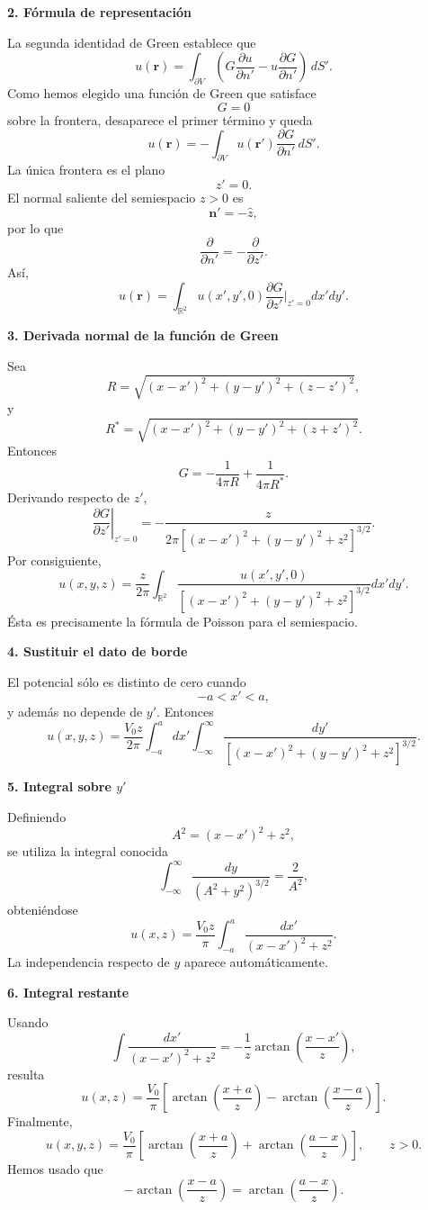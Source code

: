 \documentclass[11pt,spanish]{article}
\begin{document}
{\bf 2. Fórmula de representación}

La segunda identidad de Green establece que
$$
u(\mathbf r)
=
\int_{\partial V}
\left(
G\frac{\partial u}{\partial n'}
-
u
\frac{\partial G}{\partial n'}
\right)
\,dS'.
$$
Como hemos elegido una función de Green que satisface
$$
G=0
$$
sobre la frontera, desaparece el primer término y queda
$$
u(\mathbf r)
=
-
\int_{\partial V}
u(\mathbf r')
\frac{\partial G}{\partial n'}
\,dS'.
$$
La única frontera es el plano
$$
z'=0.
$$
El normal saliente del semiespacio $z>0$ es
$$
\mathbf n'=-\hat z,
$$
por lo que
$$
\frac{\partial}{\partial n'}
=
-\frac{\partial}{\partial z'}.
$$
Así,
$$
u(\mathbf r)
=
\int_{\mathbb R^2}
u(x',y',0)
\frac{\partial G}{\partial z'}
\Bigg|_{z'=0}
dx'dy'.
$$

{\bf 3. Derivada normal de la función de Green}

Sea
$$
R=
\sqrt{(x-x')^2+(y-y')^2+(z-z')^2},
$$
y
$$
R^*
=
\sqrt{(x-x')^2+(y-y')^2+(z+z')^2}.
$$
Entonces
$$
G
=
-\frac1{4\pi R}
+\frac1{4\pi R^*}.
$$
Derivando respecto de $z'$,
$$
\left.
\frac{\partial G}{\partial z'}
\right|_{z'=0}
=
-\frac{z}
{2\pi[(x-x')^2+(y-y')^2+z^2]^{3/2}}.
$$
Por consiguiente,
$$
u(x,y,z)
=
\frac{z}{2\pi}
\int_{\mathbb R^2}
\frac{u(x',y',0)}
{\left[(x-x')^2+(y-y')^2+z^2\right]^{3/2}}
dx'dy'.
$$
Ésta es precisamente la fórmula de Poisson para el semiespacio.

{\bf 4. Sustituir el dato de borde}

El potencial sólo es distinto de cero cuando
$$
-a<x'<a,
$$
y además no depende de $y'$. Entonces
$$
u(x,y,z)
=
\frac{V_0z}{2\pi}
\int_{-a}^{a}
dx'
\int_{-\infty}^{\infty}
\frac{dy'}
{\left[(x-x')^2+(y-y')^2+z^2\right]^{3/2}}.
$$

{\bf 5. Integral sobre $y'$}

Definiendo
$$
A^2=(x-x')^2+z^2,
$$
se utiliza la integral conocida
$$
\int_{-\infty}^{\infty}
\frac{dy}
{(A^2+y^2)^{3/2}}
=
\frac2{A^2},
$$
obteniéndose
$$
u(x,z)
=
\frac{V_0z}{\pi}
\int_{-a}^{a}
\frac{dx'}
{(x-x')^2+z^2}.
$$
La independencia respecto de $y$ aparece automáticamente.

{\bf 6. Integral restante}

Usando
$$
\int
\frac{dx'}
{(x-x')^2+z^2}
=
-\frac1z
\arctan\left(\frac{x-x'}{z}\right),
$$
resulta
$$
u(x,z)
=
\frac{V_0}{\pi}
\left[
\arctan\left(\frac{x+a}{z}\right)
-
\arctan\left(\frac{x-a}{z}\right)
\right].
$$
Finalmente,
$$
\boxed{
u(x,y,z)
=
\frac{V_0}{\pi}
\left[
\arctan\left(\frac{x+a}{z}\right)
+
\arctan\left(\frac{a-x}{z}\right)
\right],
\qquad z>0.
}
$$
Hemos usado que
$$
-\arctan\left(\frac{x-a}{z}\right)
=
\arctan\left(\frac{a-x}{z}\right).
$$
\end{document}
